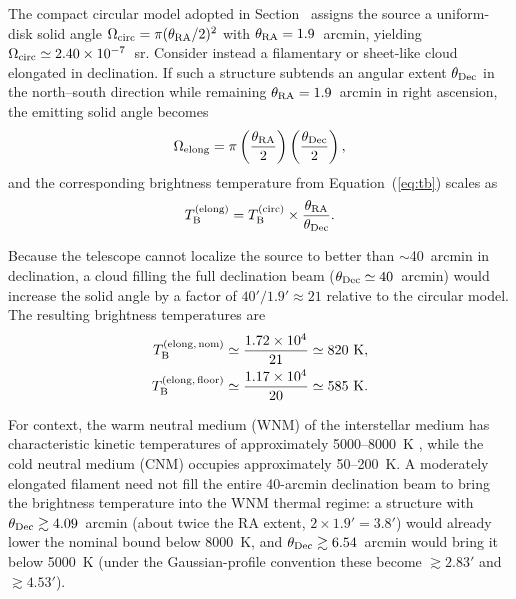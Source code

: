 \documentclass[twocolumn]{aastex701}
\newcommand{\tbeq}{T_{\rm B}}
\begin{document}
The compact circular model adopted in Section~ assigns the source a uniform-disk solid angle $\Omega_{\rm circ}=\pi(\theta_{\rm RA}/2)^2$ with $\theta_{\rm RA}=1.9$~arcmin, yielding $\Omega_{\rm circ}\simeq2.40\times10^{-7}$~sr. Consider instead a filamentary or sheet-like  cloud elongated in declination. If such a structure subtends an angular extent $\theta_{\rm Dec}$ in the north--south direction while remaining $\theta_{\rm RA}=1.9$~arcmin in right ascension, the emitting solid angle becomes
\begin{equation}
\Omega_{\rm elong}
=
\pi\left(\frac{\theta_{\rm RA}}{2}\right)
\left(\frac{\theta_{\rm Dec}}{2}\right),
\label{eq:omega_elong}
\end{equation}
and the corresponding brightness temperature from Equation~(\ref{eq:tb}) scales as
\begin{equation}
\tbeq^{\rm (elong)}
=
\tbeq^{\rm (circ)}\times\frac{\theta_{\rm RA}}{\theta_{\rm Dec}}.
\label{eq:tb_elong}
\end{equation}

Because the telescope cannot localize the source to better than $\sim$40~arcmin in declination, a cloud filling the full declination beam ($\theta_{\rm Dec}\simeq40$~arcmin) would increase the solid angle by a factor of $40'/1.9'\approx21$ relative to the circular model. The resulting brightness temperatures are
\begin{align}
\tbeq^{\rm (elong,\,nom)}
&\simeq
\frac{1.72\times10^4}{21}
\simeq
820~{\rm K},
\nonumber\\
\tbeq^{\rm (elong,\,floor)}
&\simeq
\frac{1.17\times10^4}{20}
\simeq
585~{\rm K}.
\label{eq:tb_elong_values}
\end{align}

For context, the warm neutral medium (WNM) of the interstellar medium has characteristic kinetic temperatures of approximately 5000--8000~K \citep{wolfire2003}, while the cold neutral medium (CNM) occupies approximately 50--200~K. A moderately elongated filament need not fill the entire 40-arcmin declination beam to bring the brightness temperature into the WNM thermal regime: a structure with $\theta_{\rm Dec}\gtrsim4.09$~arcmin (about twice the RA extent, $2\times1.9'=3.8'$) would already lower the nominal bound below 8000~K, and $\theta_{\rm Dec}\gtrsim6.54$~arcmin would bring it below 5000~K (under the Gaussian-profile convention these become $\gtrsim2.83'$ and $\gtrsim4.53'$).
\end{document}
